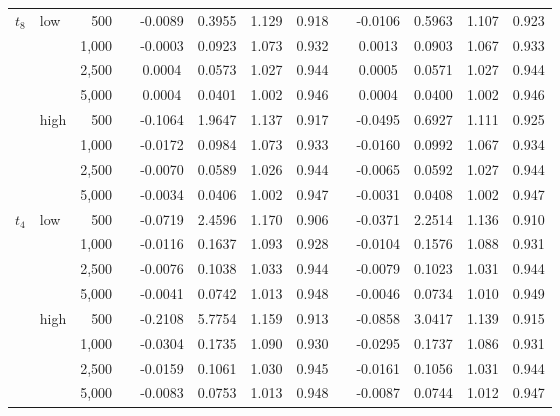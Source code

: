 \begin{table}[t]
\begin{adjustbox}{width=1\textwidth}
\begin{tabular}{llr*{9}{c}}
\addlinespace[3pt]
$t_8$ & low & 500~~ & -0.0089 & 0.3955 & 1.129 & 0.918 && -0.0106 & 0.5963 & 1.107 & 0.923\\
 &  & 1,000~~ & -0.0003 & 0.0923 & 1.073 & 0.932 && 0.0013 & 0.0903 & 1.067 & 0.933\\
 &  & 2,500~~ & 0.0004 & 0.0573 & 1.027 & 0.944 && 0.0005 & 0.0571 & 1.027 & 0.944\\
 &  & 5,000~~ & 0.0004 & 0.0401 & 1.002 & 0.946 && 0.0004 & 0.0400 & 1.002 & 0.946\\
\addlinespace[1pt]
 & high & 500~~ & -0.1064 & 1.9647 & 1.137 & 0.917 && -0.0495 & 0.6927 & 1.111 & 0.925\\
 &  & 1,000~~ & -0.0172 & 0.0984 & 1.073 & 0.933 && -0.0160 & 0.0992 & 1.067 & 0.934\\
 &  & 2,500~~ & -0.0070 & 0.0589 & 1.026 & 0.944 && -0.0065 & 0.0592 & 1.027 & 0.944\\
 &  & 5,000~~ & -0.0034 & 0.0406 & 1.002 & 0.947 && -0.0031 & 0.0408 & 1.002 & 0.947\\
\addlinespace[3pt]
$t_4$ & low & 500~~ & -0.0719 & 2.4596 & 1.170 & 0.906 && -0.0371 & 2.2514 & 1.136 & 0.910\\
 &  & 1,000~~ & -0.0116 & 0.1637 & 1.093 & 0.928 && -0.0104 & 0.1576 & 1.088 & 0.931\\
 &  & 2,500~~ & -0.0076 & 0.1038 & 1.033 & 0.944 && -0.0079 & 0.1023 & 1.031 & 0.944\\
 &  & 5,000~~ & -0.0041 & 0.0742 & 1.013 & 0.948 && -0.0046 & 0.0734 & 1.010 & 0.949\\
\addlinespace[1pt]
 & high & 500~~ & -0.2108 & 5.7754 & 1.159 & 0.913 && -0.0858 & 3.0417 & 1.139 & 0.915\\
 &  & 1,000~~ & -0.0304 & 0.1735 & 1.090 & 0.930 && -0.0295 & 0.1737 & 1.086 & 0.931\\
 &  & 2,500~~ & -0.0159 & 0.1061 & 1.030 & 0.945 && -0.0161 & 0.1056 & 1.031 & 0.944\\
 &  & 5,000~~ & -0.0083 & 0.0753 & 1.013 & 0.948 && -0.0087 & 0.0744 & 1.012 & 0.947\\
\bottomrule
\end{tabular}
\end{adjustbox}\end{table}
